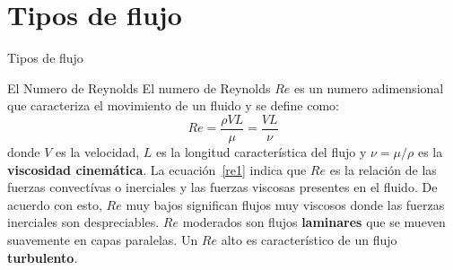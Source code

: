 \documentclass [xcolor=svgnames, t] {beamer}
\begin{document}
\section{Tipos de flujo}
\begin{frame}{Tipos de flujo}
\begin{block}{El Numero de Reynolds}
El numero de Reynolds $Re$ es un numero adimensional que caracteriza el movimiento de un fluido y se define como:
\begin{equation}
Re=\frac{\rho VL}{\mu}=\frac{VL}{\nu}
\label{re1}
\end{equation}
donde $V$ es la velocidad, $L$ es la longitud caracter\'istica del flujo y $\nu=\mu/\rho$  es la \textbf{viscosidad cinem\'atica}. La ecuaci\'on~\ref{re1} indica que $Re$ es la relaci\'on de las fuerzas convect\'ivas o inerciales y las fuerzas viscosas presentes en el fluido. De acuerdo con esto, $Re$ muy bajos significan flujos muy viscosos donde las fuerzas inerciales son despreciables. $Re$ moderados son flujos \textbf{laminares} que se mueven suavemente en capas paralelas. Un $Re$ alto es caracter\'istico de un flujo \textbf{turbulento}.  
\end{block}
\end{frame}
\end{document}
